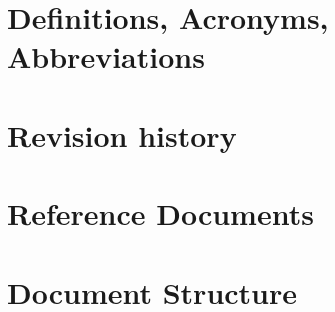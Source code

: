 \section{Definitions, Acronyms, Abbreviations}
\section{Revision history}
\section{Reference Documents}
\section{Document Structure}
